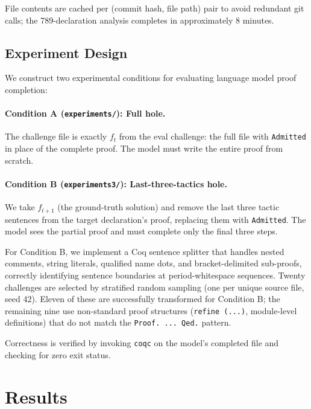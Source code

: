 \documentclass[11pt]{article}
\begin{document}
File contents are cached per (commit hash, file path) pair to avoid redundant git calls; the 789-declaration analysis completes in approximately 8 minutes.

\subsection{Experiment Design}

We construct two experimental conditions for evaluating language model proof completion:

\paragraph{Condition A (\texttt{experiments/}): Full hole.} The challenge file is exactly $f_t$ from the eval challenge: the full file with \texttt{Admitted} in place of the complete proof. The model must write the entire proof from scratch.

\paragraph{Condition B (\texttt{experiments3/}): Last-three-tactics hole.} We take $f_{t+1}$ (the ground-truth solution) and remove the last three tactic sentences from the target declaration's proof, replacing them with \texttt{Admitted}. The model sees the partial proof and must complete only the final three steps.

For Condition B, we implement a Coq sentence splitter that handles nested comments, string literals, qualified name dots, and bracket-delimited sub-proofs, correctly identifying sentence boundaries at period-whitespace sequences. Twenty challenges are selected by stratified random sampling (one per unique source file, seed 42). Eleven of these are successfully transformed for Condition B; the remaining nine use non-standard proof structures (\texttt{refine (...)}, module-level definitions) that do not match the \texttt{Proof. ... Qed.} pattern.

Correctness is verified by invoking \texttt{coqc} on the model's completed file and checking for zero exit status.

\section{Results}
\end{document}
